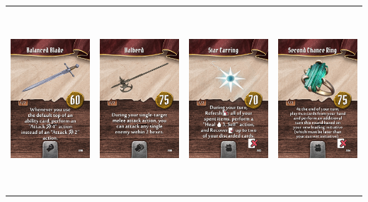 \documentclass{minimal}
\begin{document}
{\begin{longtable}{llll}
\includegraphics[width=44mm,height=68mm]{./64-151/gh-067-balanced-blade.png} &
\includegraphics[width=44mm,height=68mm]{./64-151/gh-068-halberd.png} &
\includegraphics[width=44mm,height=68mm]{./64-151/gh-069-star-earring.png} &
\includegraphics[width=44mm,height=68mm]{./64-151/gh-070-second-chance-ring.png}\\ 

\end{longtable}}
\end{document}
